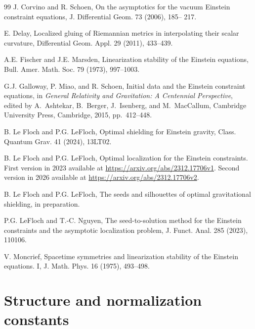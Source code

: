 \documentclass[11pt]{article}
\numberwithin{table}{section}
\numberwithin{equation}{section}
\numberwithin{table}{section}
\numberwithin{figure}{section}
\begin{document}
\begin{thebibliography}{99}
{\sc J. Corvino and R. Schoen,}
On the asymptotics for the vacuum Einstein constraint equations, 
J. Differential Geom. 73 (2006), 185-- 217.

{\sc E. Delay,}
Localized gluing of Riemannian metrics in interpolating their scalar curvature, 
Differential Geom. Appl. 29 (2011), 433--439.  

{\sc A.E. Fischer and J.E. Marsden,}
Linearization stability of the Einstein equations,
Bull. Amer. Math. Soc. 79 (1973), 997--1003.

{\sc G.J. Galloway, P. Miao, and R. Schoen,}
Initial data and the Einstein constraint equations,
in \emph{General Relativity and Gravitation: A Centennial Perspective},
edited by A.~Ashtekar, B.~Berger, J.~Isenberg, and M.~MacCallum,
Cambridge University Press, Cambridge, 2015, pp.~412--448. 

{\sc B. Le Floch and P.G. LeFloch,} 
Optimal shielding for Einstein gravity, 
Class. Quantum Grav. 41 (2024), 13LT02.  

{\sc B. Le Floch and P.G. LeFloch,}
Optimal localization for the Einstein constraints.
First version in 2023 available at \url{https://arxiv.org/abs/2312.17706v1}. Second version in 2026 available at \url{https://arxiv.org/abs/2312.17706v2}.

{\sc B. Le Floch and P.G. LeFloch,} 
The seeds and silhouettes of optimal gravitational shielding, 
in preparation.

{\sc P.G. LeFloch and T.-C. Nguyen,}
The seed-to-solution method for the Einstein constraints and the asymptotic localization problem, 
J. Funct. Anal. 285 (2023), 110106.

{\sc V. Moncrief,}
Spacetime symmetries and linearization stability of the Einstein equations. I, 
J. Math. Phys. 16 (1975), 493--498. 

\end{thebibliography} 


\appendix 

\section{Structure and normalization constants}
\label{sec-appendix-A}
\end{document}
